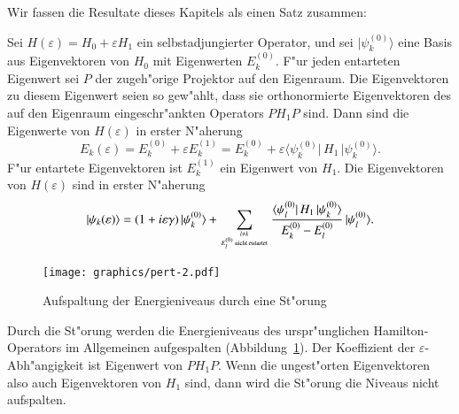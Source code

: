 Wir fassen die Resultate dieses Kapitels als einen Satz zusammen:

\begin{satz}
Sei $H(\varepsilon)=H_0+\varepsilon H_1$ ein selbstadjungierter Operator,
und sei $|\psi_k^{(0)}\rangle$ eine Basis aus Eigenvektoren von $H_0$
mit Eigenwerten $E_k^{(0)}$.
F"ur jeden entarteten Eigenwert sei $P$ der zugeh"orige Projektor auf
den Eigenraum.
Die Eigenvektoren zu diesem Eigenwert seien so gew"ahlt, dass sie
orthonormierte Eigenvektoren des auf den Eigenraum eingeschr"ankten
Operators  $PH_1P$ sind.
Dann sind die Eigenwerte von $H(\varepsilon)$ in erster N"aherung
\[
E_k(\varepsilon)
=
E_k^{(0)}+\varepsilon E_k^{(1)}
=
E_k^{(0)}+\varepsilon\langle \psi_k^{(0)}|\,H_1\,|\psi_k^{(0)}\rangle.
\]
F"ur entartete Eigenvektoren ist $E_k^{(1)}$ ein Eigenwert von $H_1$.
Die Eigenvektoren von $H(\varepsilon)$ sind in erster N"aherung
\[
|\psi_k(\varepsilon)\rangle
=
(1+i\varepsilon\gamma)\,|\psi_k^{(0)}\rangle
+
\sum_{{l\ne k}\atop{\text{$E_l^{(0)}$ nicht entartet}}}
\frac{
\langle \psi_l^{(0)}|\,H_1\,|\psi_k^{(0)}\rangle
}{
E_k^{(0)}-E_l^{(0)}
}
\,|\psi_l^{(0)}\rangle.
\]
\end{satz}

\begin{figure}
\centering
\texttt{[image: graphics/pert-2.pdf]}
\caption{Aufspaltung der Energieniveaus durch eine St"orung
\label{skript:aufspaltung}}
\end{figure}
Durch die St"orung werden die Energieniveaus des urspr"unglichen
Hamilton-Operators im Allgemeinen aufgespalten (Abbildung~\ref{skript:aufspaltung}).
Der Koeffizient der $\varepsilon$-Abh"angigkeit ist Eigenwert von $PH_1P$. 
Wenn die ungest"orten Eigenvektoren also auch Eigenvektoren von $H_1$ sind,
dann wird die St"orung die Niveaus nicht aufspalten.

